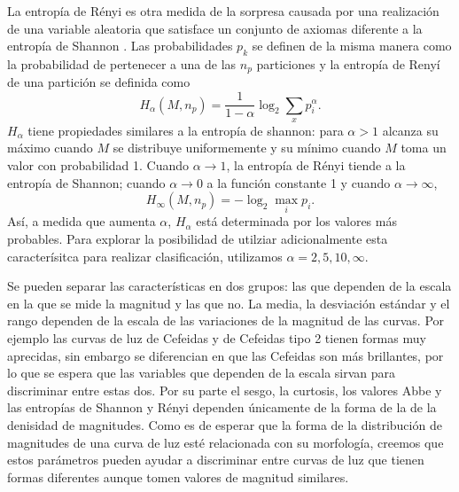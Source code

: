 \documentclass[letterpaper,12pt]{book}
\begin{document}
La entropía de Rényi \cite{renyi_measures_1961} es otra medida de la sorpresa causada por una realización de una variable aleatoria que satisface un conjunto de axiomas diferente a la entropía de Shannon \cite{renyi_measures_1961}. Las probabilidades $p_k$ se definen de la misma manera como la probabilidad de pertenecer a una de las $n_p$ particiones y la entropía de Renyí de una partición se definida como 
\begin{equation}
 H_\alpha(M,n_p) = \frac{1}{1-\alpha}\log_{2}{\sum_{x}p_{i}^{\alpha}}.
\end{equation}
$H_\alpha$ tiene propiedades similares a la entropía de shannon: para $\alpha >1$ alcanza su máximo cuando $M$ se distribuye uniformemente y su mínimo cuando $M$ toma un valor con probabilidad 1. Cuando $\alpha\to 1$, la entropía de Rényi tiende a la entropía de Shannon; cuando $\alpha\to 0$ a la función constante 1 y cuando $\alpha\to\infty$,
 \begin{equation}
 H_\infty(M,n_p) = -\log_{2}{\max_{i}{p_i}}.
\end{equation}
Así, a medida que aumenta $\alpha$, $H_\alpha$ está determinada por los valores más probables. Para explorar la posibilidad de utilziar adicionalmente esta caracterísitca para realizar clasificación, utilizamos  $\alpha = 2, 5, 10, \infty$.

Se pueden separar las características en dos grupos: las que dependen de la escala en la que se mide la magnitud y las que no. La media, la desviación estándar y el rango dependen de la escala de las variaciones de la magnitud de las curvas. Por ejemplo las curvas de luz de Cefeidas y de Cefeidas tipo 2 tienen formas muy aprecidas, sin embargo se diferencian en que las Cefeidas son más brillantes, por lo que se espera que las variables que dependen de la escala sirvan para discriminar entre estas dos. Por su parte el sesgo, la curtosis, los valores Abbe y las entropías de Shannon y Rényi dependen únicamente de la forma de la de la denisidad de magnitudes. Como es de esperar que la forma de la distribución de magnitudes de una curva de luz esté relacionada con su morfología, creemos que estos parámetros pueden ayudar a discriminar entre curvas de luz que tienen formas diferentes aunque tomen valores de magnitud similares.
\end{document}
